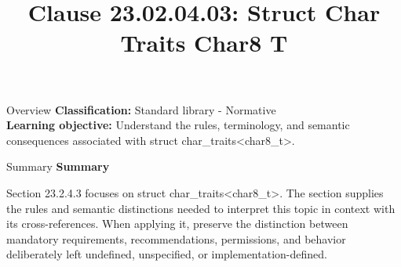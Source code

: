\documentclass[10pt,letterpaper]{article}
\title{Clause 23.02.04.03: Struct Char Traits Char8 T}
\author{}
\date{}
\begin{document}
\maketitle
\begin{CornellOverviewBox}{Overview}
\textbf{Classification:} Standard library - Normative\\[2pt]
\textbf{Learning objective:} Understand the rules, terminology, and semantic consequences associated with struct char\_traits<char8\_t>.
\end{CornellOverviewBox}\begin{CornellSummaryBox}{Summary}
{\sffamily\bfseries\color{Accent} Summary}\par\vspace{3pt}Section 23.2.4.3 focuses on struct char\_traits<char8\_t>. The section supplies the rules and semantic distinctions needed to interpret this topic in context with its cross-references. When applying it, preserve the distinction between mandatory requirements, recommendations, permissions, and behavior deliberately left undefined, unspecified, or implementation-defined.
\end{CornellSummaryBox}
\end{document}
